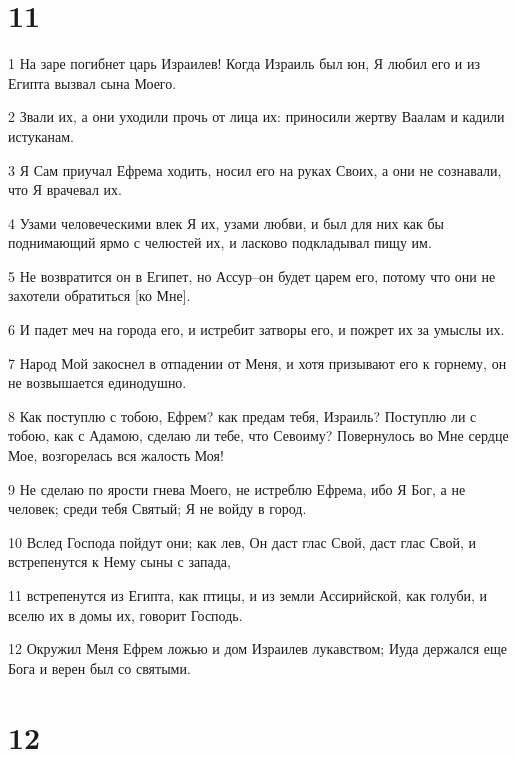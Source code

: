 \chapter{11}

\par 1 На заре погибнет царь Израилев! Когда Израиль был юн, Я любил его и из Египта вызвал сына Моего.
\par 2 Звали их, а они уходили прочь от лица их: приносили жертву Ваалам и кадили истуканам.
\par 3 Я Сам приучал Ефрема ходить, носил его на руках Своих, а они не сознавали, что Я врачевал их.
\par 4 Узами человеческими влек Я их, узами любви, и был для них как бы поднимающий ярмо с челюстей их, и ласково подкладывал пищу им.
\par 5 Не возвратится он в Египет, но Ассур--он будет царем его, потому что они не захотели обратиться [ко Мне].
\par 6 И падет меч на города его, и истребит затворы его, и пожрет их за умыслы их.
\par 7 Народ Мой закоснел в отпадении от Меня, и хотя призывают его к горнему, он не возвышается единодушно.
\par 8 Как поступлю с тобою, Ефрем? как предам тебя, Израиль? Поступлю ли с тобою, как с Адамою, сделаю ли тебе, что Севоиму? Повернулось во Мне сердце Мое, возгорелась вся жалость Моя!
\par 9 Не сделаю по ярости гнева Моего, не истреблю Ефрема, ибо Я Бог, а не человек; среди тебя Святый; Я не войду в город.
\par 10 Вслед Господа пойдут они; как лев, Он даст глас Свой, даст глас Свой, и встрепенутся к Нему сыны с запада,
\par 11 встрепенутся из Египта, как птицы, и из земли Ассирийской, как голуби, и вселю их в домы их, говорит Господь.
\par 12 Окружил Меня Ефрем ложью и дом Израилев лукавством; Иуда держался еще Бога и верен был со святыми.

\chapter{12}

